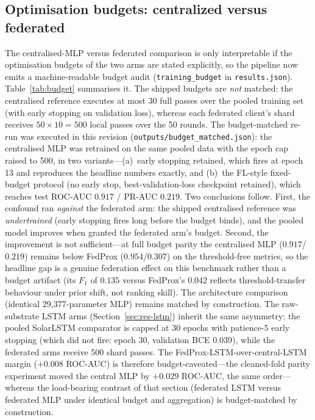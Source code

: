 \subsection{Optimisation budgets: centralized versus federated}
\label{sec:budget}

The centralised-MLP versus federated comparison is only interpretable
if the optimisation budgets of the two arms are stated explicitly, so
the pipeline now emits a machine-readable budget audit
(\texttt{training\_budget} in \texttt{results.json}).
Table~\ref{tab:budget} summarises it. The shipped budgets are
\emph{not} matched: the centralised reference executes at most 30
full passes over the pooled training set (with early stopping on
validation loss), whereas each federated client's shard receives
$50 \times 10 = 500$ local passes over the 50 rounds. The
budget-matched re-run was executed in this revision
(\texttt{outputs/budget\_matched.json}): the centralised MLP was
retrained on the same pooled data with the epoch cap raised to 500,
in two variants---(a)~early stopping retained, which fires at epoch
13 and reproduces the headline numbers exactly, and (b)~the FL-style
fixed-budget protocol (no early stop, best-validation-loss checkpoint
retained), which reaches test ROC-AUC $0.917$ / PR-AUC $0.219$. Two
conclusions follow. First, the confound ran \emph{against} the
federated arm: the shipped centralised reference was \emph{undertrained}
(early stopping fires long before the budget binds), and the pooled
model improves when granted the federated arm's budget. Second, the
improvement is not sufficient---at full budget parity the centralised
MLP ($0.917$/$0.219$) remains below FedProx ($0.954$/$0.307$) on the
threshold-free metrics, so the headline gap is a genuine federation
effect on this benchmark rather than a budget artifact (its $F_1$ of
$0.135$ versus FedProx's $0.042$ reflects threshold-transfer behaviour
under prior shift, not ranking skill). The architecture comparison
(identical 29{,}377-parameter MLP) remains matched by construction.
The raw-substrate LSTM arms (Section~\ref{sec:res-lstm}) inherit the
same asymmetry: the pooled SolarLSTM comparator is capped at 30
epochs with patience-5 early stopping (which did not fire: epoch 30,
validation BCE 0.039), while the federated arms receive 500 shard
passes. The FedProx-LSTM-over-central-LSTM margin ($+0.008$ ROC-AUC)
is therefore budget-caveated---the cleaned-fold parity experiment
moved the central MLP by $+0.029$ ROC-AUC, the same order---whereas
the load-bearing contrast of that section (federated LSTM versus
federated MLP under identical budget and aggregation) is
budget-matched by construction.

